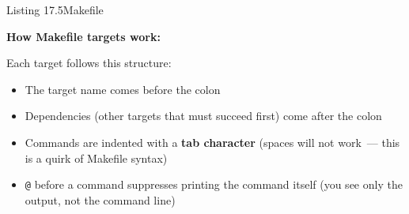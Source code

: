 \begin{codeboxcap}{\textcolor{accent}{Listing 17.5}\enspace Makefile}
\begin{Shaded}
\begin{Highlighting}[]
\ErrorTok{    }
\end{Highlighting}
\end{Shaded}

\end{codeboxcap}

\noindent{}\textbf{How Makefile targets work:}

Each target follows this structure:

\begin{codebox}[short]

\begin{Shaded}
\begin{Highlighting}[]
\ErrorTok{    }
\end{Highlighting}
\end{Shaded}

\end{codebox}

\begin{itemize}
\tightlist
\item
  The target name comes before the colon
\item
  Dependencies (other targets that must succeed first) come after the colon
\item
  Commands are indented with a \textbf{tab character} (spaces will not work~--- this is a quirk of Makefile syntax)
\item
  \texttt{@} before a command suppresses printing the command itself (you see only the output, not the command line)
\end{itemize}

